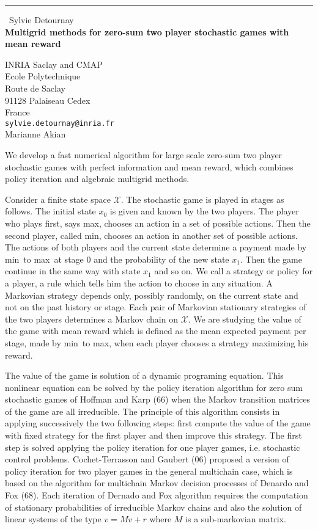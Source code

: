 \documentclass{report}
\begin{document}
\begin{center}
\rule{6in}{1pt} \
{\large Sylvie Detournay \\
{\bf Multigrid methods for zero-sum two player stochastic games with mean reward}}

INRIA Saclay and CMAP \\ Ecole Polytechnique \\ Route de Saclay \\ 91128 Palaiseau Cedex \\ France
\\
{\tt sylvie.detournay@inria.fr}\\
Marianne Akian\end{center}

\def\MIN{{\sc min}}
\def\MAX{{\sc max}}
\def\X{\mathcal{X}}


We develop a fast numerical algorithm for large scale zero-sum two player
stochastic games with perfect information and mean reward, which combines
policy iteration and algebraic multigrid methods.

Consider a finite state space $\X$. The stochastic game is played in
stages as follows. The initial state $x_0$ is given and known by the two
players. The player who plays first, says \MAX, chooses an action in a
set of possible actions. Then the second player, called \MIN, chooses an
action in another set of possible actions. The actions of both players
and the current state determine a payment made by \MIN\ to \MAX\ at stage
$0$ and the probability of the new state $x_1$. Then the game continue in
the same way with state $x_1$ and so on. We call a strategy or policy for
a player, a rule which tells him the action to choose in any situation. A
Markovian strategy depends only, possibly randomly, on the current state
and not on the past history or stage. Each pair of Markovian stationary
strategies of the two players determines a Markov chain on $\X$. We are
studying the value of the game with mean reward which is defined as the
mean expected payment per stage, made by \MIN\ to \MAX, when each player
chooses a strategy maximizing his reward.

The value of the game is solution of a dynamic programing equation. This
nonlinear equation can be solved by the policy iteration algorithm for
zero sum stochastic games of Hoffman and Karp (66) when the Markov
transition matrices of the game are all irreducible. The principle of
this algorithm consists in applying successively the two following steps:
first compute the value of the game with fixed strategy for the first
player and then improve this strategy. The first step is solved applying
the policy iteration for one player games, i.e. stochastic control
problems. Cochet-Terrasson and Gaubert (06) proposed a version of policy
iteration for two player games in the general multichain case, which is
based on the algorithm for multichain Markov decision processes of
Denardo and Fox (68). Each iteration of Dernado and Fox algorithm
requires the computation of stationary probabilities of irreducible
Markov chains and also the solution of linear systems of the type $v = M
v + r$ where $M$ is a sub-markovian matrix.
\end{document}
